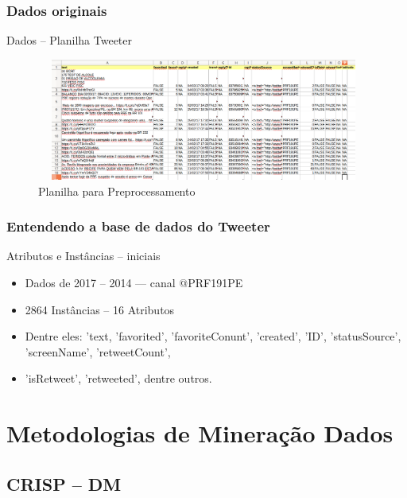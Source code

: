 \documentclass[11pt]{beamer}
\begin{document}
\begin{frame}\frametitle{ Dados originais}
	\transblindsvertical[duration=2, direction=25]
	\begin{block}{ Dados -- Planilha Tweeter}
		\begin{figure}[!ht]
			\centering %
			\caption{Planilha para Preprocessamento}
			\includegraphics[width=110mm, height=40mm]{Figuras/BigData/tweetPRF.png}
		\end{figure}
	\end{block}
\end{frame}

\begin{frame}\frametitle{ Entendendo a base de dados do Tweeter}
	\begin{exampleblock}{Atributos e Instâncias -- iniciais}
		\begin{itemize}
			\item Dados de 2017 -- 2014 --- canal @PRF191PE
			\pause
			\item 2864 Instâncias -- 16 Atributos
			\pause
			\item Dentre eles: 'text, 'favorited', 'favoriteConunt', 'created', 'ID', 'statusSource', 'screenName', 'retweetCount',
			\pause
			\item 'isRetweet', 'retweeted', dentre outros.		
		\end{itemize}
	\end{exampleblock}
\end{frame}


\section{ Metodologias de Mineração Dados}
\subsection*{ CRISP -- DM}
\end{document}
